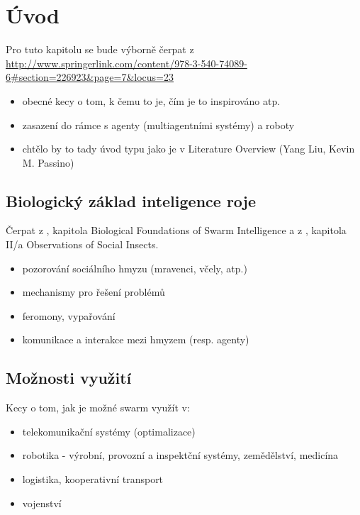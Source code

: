 \documentclass[a4paper,12pt]{article}
\let\stdsection\section
\renewcommand\section{\newpage\stdsection}
\begin{document}


\tableofcontents



\section{Úvod}
Pro tuto kapitolu se bude výborně čerpat z \cite{Blum08SwarmInt} \\
\url{http://www.springerlink.com/content/978-3-540-74089-6#section=226923&page=7&locus=23}

\begin{itemize}
  \item obecné kecy o tom, k čemu to je, čím je to inspirováno atp.
  \item zasazení do rámce s agenty (multiagentními systémy) a roboty
  \item chtělo by to tady úvod typu jako je v Literature Overview (Yang Liu, Kevin M. Passino)
\end{itemize}

\subsection{Biologický základ inteligence roje}
Čerpat z \cite{Blum08SwarmInt}, kapitola Biological Foundations of Swarm Intelligence
a z \cite{fleischer2005}, kapitola II/a Observations of Social Insects.
\begin{itemize}
  \item pozorování sociálního hmyzu (mravenci, včely, atp.)
  \item mechanismy pro řešení problémů
  \item feromony, vypařování
  \item komunikace a interakce mezi hmyzem (resp. agenty)
\end{itemize}

\subsection{Možnosti využití}
Kecy o tom, jak je možné swarm využít v:
\begin{itemize}
  \item telekomunikační systémy (optimalizace)
  \item robotika - výrobní, provozní a inspektční systémy, zemědělství, medicína
  \item logistika, kooperativní transport
  \item vojenství
\end{itemize}
\end{document}
